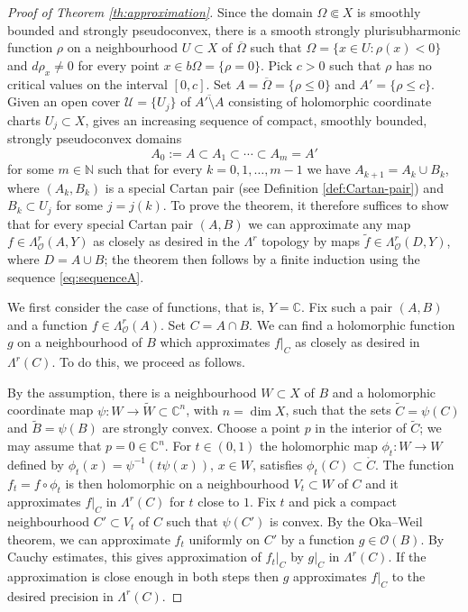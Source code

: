 \documentclass[11pt]{amsart}
\numberwithin{equation}{section}
\theoremstyle{definition}
\newcommand\Ucal{\mathcal{U}}
\newcommand\Oscr{\mathscr{O}}
\newcommand\C{\mathbb{C}}
\newcommand\N{\mathbb{N}}
\newcommand\wt{\widetilde}
\begin{document}
\begin{proof}[Proof of Theorem \ref{th:approximation}]
Since the domain $\Omega\Subset X$ is smoothly bounded
and strongly pseudoconvex, there is a smooth strongly plurisubharmonic
function $\rho$ on a neighbourhood $U\subset X$ of $\overline\Omega$
such that $\Omega=\{x\in U:\rho(x)<0\}$ and $d\rho_x\ne 0$
for every point $x\in b\Omega =\{\rho=0\}$. Pick $c>0$ such that
$\rho$ has no critical values on the interval $[0,c]$.
Set $A=\overline\Omega=\{\rho\le 0\}$ and $A'=\{\rho\le c\}$.
Given an open cover $\Ucal=\{U_j\}$ of $\overline{A'\setminus A}$ 
consisting of holomorphic coordinate charts $U_j\subset X$,  
\cite[Lemma 5.10.3]{Forstneric2017E} gives an increasing 
sequence of compact, smoothly bounded, 
strongly pseudoconvex domains 
\begin{equation}\label{eq:sequenceA}
	A_0:=A \subset A_1 \subset \cdots \subset A_m=A'
\end{equation}
for some $m\in\N$ such that for every $k=0,1,\ldots,m-1$ we have 
$A_{k+1}=A_k\cup B_k$, where $(A_k,B_k)$ is a special Cartan pair
(see Definition \ref{def:Cartan-pair}) and $B_k\subset U_j$
for some $j=j(k)$.  
To prove the theorem, it therefore suffices to show that for 
every special Cartan pair $(A,B)$ we can approximate any map 
$f\in \Lambda^r_{\Oscr} (A,Y)$ as closely 
as desired in the $\Lambda^r$ topology 
by maps $\tilde f\in \Lambda^r_{\Oscr} (D,Y)$, 
where $D=A\cup B$; the theorem then follows by a finite induction
using the sequence \eqref{eq:sequenceA}.

We first consider the case of functions, that is, $Y=\C$. 
Fix such a pair $(A,B)$ and a function 
$f\in \Lambda^r_\Oscr(A)$. Set $C=A\cap B$.
We can find a holomorphic function $g$ on a neighbourhood of $B$ 
which approximates $f|_C$ as closely as desired in $\Lambda^r(C)$. 
To do this, we proceed as follows.

By the assumption, there is a neighbourhood $W\subset X$ 
of $B$ and a holomorphic coordinate map $\psi:W\to \wt W\subset\C^n$,
with $n=\dim X$, such that the sets $\wt C=\psi(C)$ and $\wt B=\psi(B)$
are strongly convex. Choose a point $p$ in the interior of $\wt C$;
we may assume that $p=0\in\C^n$. For $t\in (0,1)$
the holomorphic map $\phi_t:W\to W$ defined by 
$\phi_t(x)=\psi^{-1}(t \psi(x))$, $x\in W$, satisfies
$\phi_t(C)\subset \mathring C$. 
The function $f_t = f \circ\phi_t$ is then holomorphic on a 
neighbourhood $V_t \subset W$ of $C$ and it approximates
$f|_C$ in $\Lambda^r(C)$ for $t$ close to $1$. 
Fix $t$ and pick a compact neighbourhood 
$C'\subset V_t$ of $C$ such that $\psi(C')$ is convex. 
By the Oka--Weil theorem, we can approximate $f_t$ uniformly on 
$C'$ by a function $g\in \Oscr(B)$. By Cauchy estimates, 
this gives approximation of $f_t|_C$ by $g|_C$ in $\Lambda^r(C)$. 
If the approximation is close enough in both steps then $g$ 
approximates $f|_C$ to the desired precision in $\Lambda^r(C)$. 


\end{proof}
\end{document}
